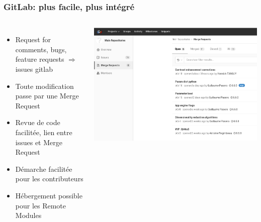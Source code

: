 \documentclass[8pt]{beamer}
\begin{document}
  
\begin{frame}
  \frametitle{GitLab: plus facile, plus intégré}
  \begin{columns}
    \begin{itemize}
    \item Request for comments, bugs, feature requests $\Rightarrow$ issues gitlab
    \item Toute modification passe par une Merge Request
    \item Revue de code facilitée, lien entre issues et Merge Request
    \item Démarche facilitée pour les contributeurs
    \item Hébergement possible pour les Remote Modules
    \end{itemize}
    \includegraphics[width=\textwidth]{images/gitlab_mr.png}
    \end{columns}
\end{frame}
\end{document}
